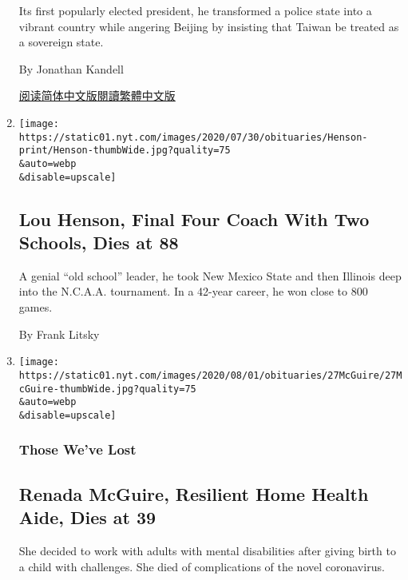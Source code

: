 \begin{enumerate}
  Its first popularly elected president, he transformed a police state
  into a vibrant country while angering Beijing by insisting that Taiwan
  be treated as a sovereign state.

  By Jonathan Kandell

  \href{https://cn.nytimes.com/asia-pacific/20200730/lee-teng-hui-dead/}{阅读简体中文版}\href{https://cn.nytimes.com/asia-pacific/20200730/lee-teng-hui-dead/zh-hant/}{閱讀繁體中文版}
\item
  \href{/2020/07/29/sports/ncaabasketball/lou-henson-dead.html}{}

  \texttt{[image: https://static01.nyt.com/images/2020/07/30/obituaries/Henson-print/Henson-thumbWide.jpg?quality=75\\\&auto=webp\\\&disable=upscale]}

  \hypertarget{lou-henson-final-four-coach-with-two-schools-dies-at-88}{%
  \subsection{Lou Henson, Final Four Coach With Two Schools, Dies at
  88}\label{lou-henson-final-four-coach-with-two-schools-dies-at-88}}

  A genial ``old school'' leader, he took New Mexico State and then
  Illinois deep into the N.C.A.A. tournament. In a 42-year career, he
  won close to 800 games.

  By Frank Litsky
\item
  \href{/2020/07/29/obituaries/renada-mcguire-dead-coronavirus.html}{}

  \texttt{[image: https://static01.nyt.com/images/2020/08/01/obituaries/27McGuire/27McGuire-thumbWide.jpg?quality=75\\\&auto=webp\\\&disable=upscale]}

  \hypertarget{those-weve-lost-1}{%
  \subsubsection{Those We've Lost}\label{those-weve-lost-1}}

  \hypertarget{renada-mcguire-resilient-home-health-aide-dies-at-39-1}{%
  \subsection{Renada McGuire, Resilient Home Health Aide, Dies at
  39}\label{renada-mcguire-resilient-home-health-aide-dies-at-39-1}}

  She decided to work with adults with mental disabilities after giving
  birth to a child with challenges. She died of complications of the
  novel coronavirus.


\end{enumerate}
